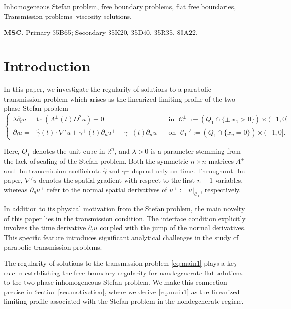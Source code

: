 \documentclass[12pt]{article}
\numberwithin{Theorem}{section}
\theoremstyle{definition}
\theoremstyle{remark}
\numberwithin{equation}{section}
\DeclareMathOperator{\C}{\mathcal{C}}
\DeclareMathOperator*{\tr}{tr}
\newcommand{\p}{\partial}
\begin{document}
\smallskip
{} Inhomogeneous Stefan problem, free boundary problems, flat free boundaries, Transmission problems, viscosity solutions.

\smallskip
\noindent\textbf{MSC.}
Primary 35B65; Secondary 35K20, 35D40, 35R35, 80A22.


\section{Introduction}

In this paper, we investigate the regularity of solutions to a  parabolic transmission problem which arises as the linearized limiting profile of the two-phase Stefan problem
\begin{equation} \label{eq:main1}
\begin{cases}
        \lambda \p_t u - \tr(A^{\pm}(t) D^2 u)= 0 & \text{ in }\C_{1}^{\pm}:= (Q_1 \cap \{ \pm \,x_n> 0\}) \times (-1,0] \\
        \p_t u= -\hat{\gamma}(t) \cdot  \nabla' u  + \gamma^+( t) \p_n u^+ - \gamma^-(t) \p_n u^- & \text{ on }\C_{1}':= (Q_1 \cap \{ x_n= 0\}) \times (-1,0].
\end{cases}
\end{equation}






Here, $Q_1$ denotes the unit cube in $\mathbb{R}^n$, and $\lambda > 0$ is a parameter stemming from the lack of scaling of the Stefan problem.  Both the symmetric $n \times n$ matrices $A^\pm$ and the transmission coefficients $\hat{\gamma}$ and $\gamma^\pm$ depend only on time. Throughout the paper, $\nabla' u$ denotes the spatial gradient with respect to the first $n-1$ variables, whereas $\partial_n u^\pm$ refer to the normal spatial derivatives of $u^\pm := u\vert{}_{\overline{\mathcal{C}_1^\pm}}$, respectively.






In addition to its physical motivation from the Stefan problem, the main  novelty of this paper lies in the transmission condition. The interface condition explicitly involves the time derivative $\partial_t u$ coupled with the jump of the normal derivatives. This specific feature introduces significant analytical challenges in the study of parabolic transmission problems. 

The regularity of solutions to the transmission problem \eqref{eq:main1} plays a key role in establishing the free boundary regularity for nondegenerate flat solutions to the two-phase inhomogeneous Stefan problem. We make this connection precise in Section \ref{sec:motivation}, where we derive \eqref{eq:main1} as the linearized limiting profile associated with the Stefan problem in the nondegenerate regime.
\end{document}
